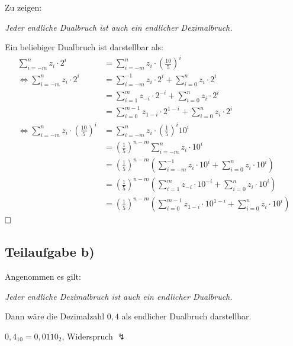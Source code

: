 \documentclass{llncs}
\begin{document}
Zu zeigen: 
\begin{center}
\textit{Jeder endliche Dualbruch ist auch ein endlicher Dezimalbruch.}
\end{center}
Ein beliebiger Dualbruch ist darstellbar als:
\begin{align*}
\sum_{i=-m}^{n} z_{i} \cdot 2^{i} &= \sum_{i=-m}^{n} z_{i} \cdot \left( \frac{10}{5} \right)^{i} \\
\Leftrightarrow \sum_{i=-m}^{n} z_{i} \cdot 2^{i} &= \sum_{i=-m}^{-1} z_{i} \cdot 2^{i} + \sum_{i=0}^{n} z_{i} \cdot 2^{i} \\
                                  &= \sum_{i=1}^{m} z_{-i} \cdot 2^{-i} + \sum_{i=0}^{n} z_{i} \cdot 2^{i} \\
                                  &= \sum_{i=0}^{m-1} z_{1-i} \cdot 2^{1-i} + \sum_{i=0}^{n} z_{i} \cdot 2^{i}\\
\Leftrightarrow \sum_{i=-m}^{n} z_{i} \cdot \left( \frac{10}{5} \right)^{i} &= \sum_{i=-m}^{n} z_{i} \cdot \left(\frac{1}{5}\right)^{i} 10^{i} \\
                                  &= \left(\frac{1}{5}\right)^{n-m} \sum_{i=-m}^{n} z_{i} \cdot 10^{i} \\
                                  &= \left(\frac{1}{5}\right)^{n-m} \left( \sum_{i=-m}^{-1} z_{i} \cdot 10^{i} + \sum_{i=0}^{n} z_{i} \cdot 10^{i} \right) \\
                                  &= \left(\frac{1}{5}\right)^{n-m} \left( \sum_{i=1}^{m} z_{-i} \cdot 10^{-i} + \sum_{i=0}^{n} z_{i} \cdot 10^{i} \right) \\
                                  &= \left(\frac{1}{5}\right)^{n-m} \left( \sum_{i=0}^{m-1} z_{1-i} \cdot 10^{1-i} + \sum_{i=0}^{n} z_{i} \cdot 10^{i} \right)
\end{align*}
$\hfill \square$


\subsection*{Teilaufgabe b)}

Angenommen es gilt:
\begin{center}
\textit{Jeder endliche Dezimalbruch ist auch ein endlicher Dualbruch.}
\end{center}
Dann w\"are die Dezimalzahl $0,4$ als endlicher Dualbruch darstellbar.
\begin{center}
$0,4_{10} = 0,\overline{0110}_2$, Widerspruch $\lightning$
\end{center}
\end{document}
